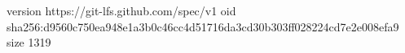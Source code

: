 version https://git-lfs.github.com/spec/v1
oid sha256:d9560c750ea948e1a3b0c46cc4d51716da3cd30b303ff028224cd7e2e008efa9
size 1319
